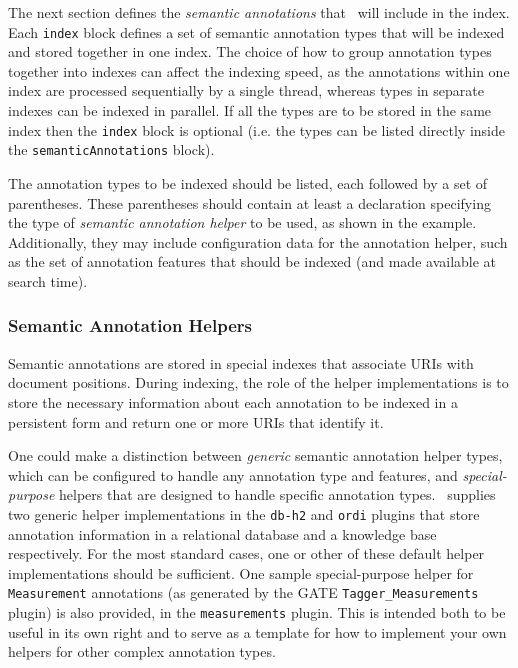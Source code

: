 The next section defines the {\em semantic annotations} that \Mimir\ will
include in the index.  Each \lstinline!index! block defines a set of semantic
annotation types that will be indexed and stored together in one index.  The
choice of how to group annotation types together into indexes can affect the
indexing speed, as the annotations within one index are processed sequentially
by a single thread, whereas types in separate indexes can be indexed in
parallel.  If all the types are to be stored in the same index then the
\lstinline!index! block is optional (i.e. the types can be listed directly
inside the \lstinline!semanticAnnotations! block).

The annotation types to be indexed should be listed, each followed by a set of
parentheses. These parentheses should contain at least a declaration specifying
the type of {\em semantic annotation helper} to be used, as shown in the
example. Additionally, they may include configuration data for the annotation
helper, such as the set of annotation features that should be indexed (and made
available at search time).

\subsubsection{Semantic Annotation Helpers}

Semantic annotations are stored in special indexes that associate URIs with
document positions. During indexing, the role of the helper implementations is 
to store the necessary information about each annotation to be indexed in a
persistent form and return one or more URIs that identify it.

One could make a distinction between {\em generic} semantic annotation helper
types, which can be configured to handle any annotation type and features, and
{\em special-purpose} helpers that are designed to handle specific annotation
types.  \Mimir\ supplies two generic helper implementations in the {\tt db-h2}
and {\tt ordi} plugins that store annotation information in a relational
database and a knowledge base respectively.  For the most standard cases, one
or other of these default helper implementations should be sufficient.  One
sample special-purpose helper for {\tt Measurement} annotations (as generated
by the GATE {\tt Tagger\_Measurements} plugin) is also provided, in the
{\tt measurements} plugin.  This is intended both to be useful in its own right
and to serve as a template for how to implement your own helpers for other
complex annotation types.


